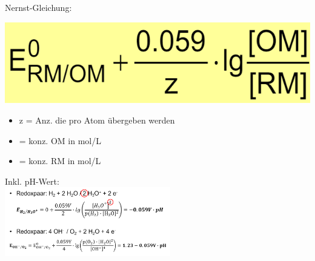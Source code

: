     Nernst-Gleichung:\\
    \begin{minipage}{0.4\linewidth}
        \includegraphics[width=\linewidth]{pictures/Nernst.png}
    \end{minipage}
    \hfill
    \begin{minipage}{0.55\linewidth}
        \begin{itemize}
            \item z = Anz.  die pro Atom übergeben werden
            \item \ce{[OM]} = konz. OM in mol/L
            \item \ce{[RM]} = konz. RM in mol/L
        \end{itemize}
    \end{minipage}

    \begin{center}
        Inkl. pH-Wert:\\
        \includegraphics[height=3cm]{pictures/Nernstph.png}
    \end{center}